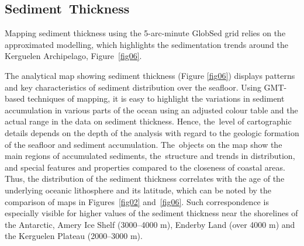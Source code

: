 \documentclass[geomatics,article,accept,pdftex,moreauthors]{Definitions/mdpi}
\begin{document}
\subsection{Sediment~Thickness}

Mapping sediment thickness using the 5-arc-minute GlobSed grid relies on the approximated modelling, which highlights the sedimentation trends around the Kerguelen Archipelago, Figure~\ref{fig06}. 

The analytical map showing sediment thickness (Figure \ref{fig06}) displays patterns and key characteristics of sediment distribution over the seafloor. Using GMT-based techniques of mapping, it is easy to highlight the variations in sediment accumulation in various parts of the ocean using an  adjusted colour table and the actual range in the data on sediment thickness. Hence, the~level of cartographic details depends on the depth of the analysis with regard to the geologic formation of the seafloor and sediment accumulation. The~objects on the map show the main regions of accumulated sediments, the~structure and trends in distribution, and special features and properties compared to the closeness of coastal areas. Thus, the distribution of the sediment thickness correlates with the age of the underlying oceanic lithosphere and its latitude, which can be noted by the comparison of maps in Figures~\ref{fig02} and~\ref{fig06}. Such correspondence is especially visible for higher values of the sediment thickness near the shorelines of the Antarctic, Amery Ice Shelf (3000--4000 m), Enderby Land (over 4000 m) and the Kerguelen Plateau (2000--3000 m). 

\end{document}
